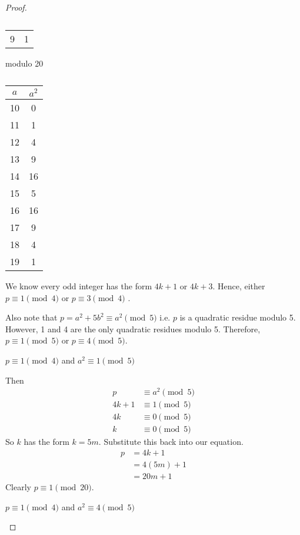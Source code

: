 \begin{proof}
\begin{table}[H]
\begin{subtable}[b]{.24\linewidth}
\begin{tabular}{c|c}
		9 & 1 \\
	\end{tabular}
	\caption*{modulo 20}
\end{subtable}
\begin{subtable}[b]{.24\linewidth}
	\centering
	\begin{tabular}{c|c}
		$a$ & $a^2$ \\ \hline
		10 & 0 \\
		11 & 1 \\
		12 & 4 \\
		13 & 9 \\
		14 & 16 \\
		15 & 5 \\
		16 & 16 \\
		17 & 9 \\
		18 & 4 \\
		19 & 1
	\end{tabular}
	\caption*{}
\end{subtable}
\end{table}


We know every odd integer has the form $4k+1$ or $4k+3$. Hence, either
$p \equiv 1 \pmod 4$ or $p \equiv 3 \pmod 4$ .

Also note that $p = a^2 + 5b^2 \equiv a^2 \pmod 5$ i.e. $p$ is a quadratic
residue modulo 5. However, 1 and 4 are the only quadratic residues modulo 5.
Therefore, $p \equiv 1 \pmod 5$ or $p \equiv 4 \pmod 5$.

\begin{case}
$p \equiv 1 \pmod 4$ and $a^2 \equiv 1 \pmod 5$

Then
\begin{align*}
		  p &\equiv a^2 \pmod 5 \\
	 4k + 1 &\equiv 1 \pmod 5 \\
	     4k &\equiv 0 \pmod 5 \\
	      k &\equiv 0 \pmod 5
\end{align*}
So $k$ has the form $k=5m$. Substitute this back into our equation.
\begin{align*}
	p &= 4k + 1 \\
	  &= 4(5m) + 1 \\
	  &= 20m + 1
\end{align*}
Clearly $p \equiv 1 \pmod{20}$.
\end{case}

\begin{case}
$p \equiv 1 \pmod 4$ and $a^2 \equiv 4 \pmod 5$


\end{case}
\end{proof}

